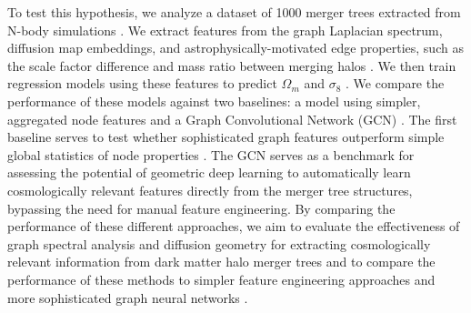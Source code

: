 \documentclass[twocolumn]{aastex631}
\begin{document}
To test this hypothesis, we analyze a dataset of 1000 merger trees extracted from N-body simulations \citep{bose2022constructinghighfidelityhalomerger}. We extract features from the graph Laplacian spectrum, diffusion map embeddings, and astrophysically-motivated edge properties, such as the scale factor difference and mass ratio between merging halos \citep{bose2022constructinghighfidelityhalomerger,chandrogómez2025accuracydarkmatterhalo}. We then train regression models using these features to predict $\Omega_m$ and $\sigma_8$ \citep{chandrogómez2025accuracydarkmatterhalo}. We compare the performance of these models against two baselines: a model using simpler, aggregated node features and a Graph Convolutional Network (GCN) \citep{bose2022constructinghighfidelityhalomerger,jung2024mergertreebasedgalaxymatching}. The first baseline serves to test whether sophisticated graph features outperform simple global statistics of node properties \citep{bose2022constructinghighfidelityhalomerger}. The GCN serves as a benchmark for assessing the potential of geometric deep learning to automatically learn cosmologically relevant features directly from the merger tree structures, bypassing the need for manual feature engineering. By comparing the performance of these different approaches, we aim to evaluate the effectiveness of graph spectral analysis and diffusion geometry for extracting cosmologically relevant information from dark matter halo merger trees and to compare the performance of these methods to simpler feature engineering approaches and more sophisticated graph neural networks \citep{bose2022constructinghighfidelityhalomerger,jung2024mergertreebasedgalaxymatching,chandrogómez2025accuracydarkmatterhalo}.
\
\
\end{document}
